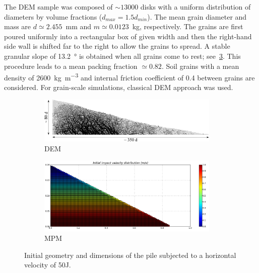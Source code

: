 \documentclass[3p,times,procedia,number]{elsarticle}
\begin{document}
The DEM sample was composed of $\sim13000$ disks with a uniform distribution of 
diameters by volume fractions ($d_{max} = 1.5 d_{min}$). The mean grain 
diameter and mass are $d\simeq 2.455 $~\si{\mm} and $m\simeq 0.0123$~\si{\kg}, 
respectively. The grains are first poured uniformly into a rectangular box of 
given width and then the right-hand side wall is shifted far to the right 
to allow the grains to spread. A stable granular slope of 13.2~\si{\degree} is 
obtained when all grains come to rest; see~\cref{fig:slope_configuration}. This 
procedure leads to a mean packing fraction $\simeq 0.82$. Soil grains with a 
mean density of 2600~\si{\kg\per\m\cubed} and internal friction coefficient of 
0.4 between grains are considered. For grain-scale simulations, classical DEM
approach was used. 

\begin{figure}[tbhp]
  \centering
  \begin{subfigure}[b]{0.47\textwidth}
    \centering
    \includegraphics[width=0.95\textwidth]{figs/slope_configuration}
    \caption{DEM}
    \label{fig:dem_slope_configuration}
  \end{subfigure}
  \begin{subfigure}[b]{0.47\textwidth}
    \centering
    \includegraphics[width=0.95\textwidth]{figs/mpm_velocity_slope}
    \caption{MPM}
    \label{fig:mpm_slope_setup}
  \end{subfigure}
  \caption{Initial geometry and dimensions of the pile subjected to a horizontal 
    velocity of 50J.}
  \label{fig:slope_configuration}
\end{figure}
\end{document}
